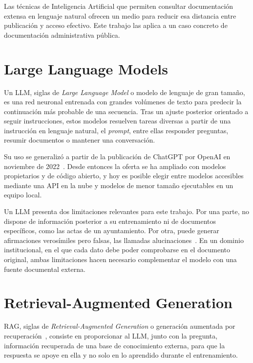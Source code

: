 \documentclass[11pt, a4paper]{report}
\begin{document}
	Las técnicas de Inteligencia Artificial que permiten consultar documentación
	extensa en lenguaje natural ofrecen un medio para reducir esa distancia entre
	publicación y acceso efectivo. Este trabajo las aplica a un caso concreto de
	documentación administrativa pública.

	\section{Large Language Models}

	Un LLM, siglas de \textit{Large Language Model} o modelo de lenguaje de gran
	tamaño, es una red neuronal entrenada con grandes volúmenes de texto
	para predecir la continuación más probable de una secuencia. Tras un ajuste
	posterior orientado a seguir instrucciones, estos modelos resuelven tareas
	diversas a partir de una instrucción en lenguaje natural, el \textit{prompt}, entre ellas responder preguntas, resumir documentos o
	mantener una conversación.

	Su uso se generalizó a partir de la publicación de ChatGPT por OpenAI en
	noviembre de 2022~\cite{openai2022-chatgpt}. Desde entonces la oferta se ha
	ampliado con modelos propietarios y de código abierto, y hoy es posible elegir entre modelos accesibles mediante una API en la nube y modelos
	de menor tamaño ejecutables en un equipo local.

	Un LLM presenta dos limitaciones relevantes para este trabajo. Por una parte,
	no dispone de información posterior a su entrenamiento ni de documentos
	específicos, como las actas de un ayuntamiento. Por otra, puede generar
	afirmaciones verosímiles pero falsas, las llamadas alucinaciones~\cite{ji2023-hallucination}. En un dominio institucional, en el
	que cada dato debe poder comprobarse en el documento original, ambas
	limitaciones hacen necesario complementar el modelo con una fuente documental
	externa.

	\section{Retrieval-Augmented Generation}

	RAG, siglas de \textit{Retrieval-Augmented Generation} o generación aumentada
	por recuperación~\cite{lewis2020-rag}, consiste en
	proporcionar al LLM, junto con la pregunta, información recuperada de una base
	de conocimiento externa, para que la respuesta se apoye en ella y no solo en
	lo aprendido durante el entrenamiento.
\end{document}
